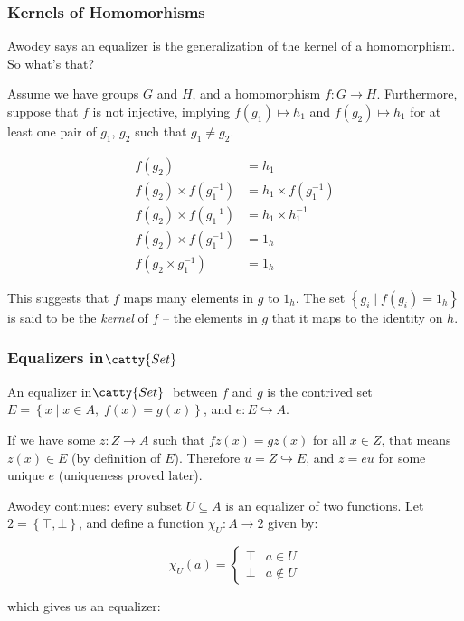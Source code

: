\documentclass[]{article}
\newcommand{\setn}[1]{\left\{#1\right\}}
\newcommand{\tfarr}[4][\to]{\ensuremath{#2 : #3 #1 #4}}
\newcommand{\cat}[1]{\ensuremath{\!\! \catty{#1} \,\,}}
\begin{document}
\subsubsection{Kernels of Homomorhisms}

Awodey says an equalizer is the generalization of the kernel of a homomorphism.
So what's that?

Assume we have groups $G$ and $H$, and a homomorphism \tfarr{f}{G}{H}.
Furthermore, suppose that $f$ is not injective, implying $f(g_1) \mapsto h_1$
and $f(g_2) \mapsto h_1$ for at least one pair of $g_1$, $g_2$ such that $g_1
\not = g_2$.

\begin{align*}
  f(g_2) &= h_1 \\
  f(g_2) \times f(g_1^{-1}) &= h_1 \times f(g_1^{-1}) \\
  f(g_2) \times f(g_1^{-1}) &= h_1 \times h_1^{-1} \\
  f(g_2) \times f(g_1^{-1}) &= 1_h \\
  f(g_2 \times g_1^{-1}) &= 1_h
\end{align*}

This suggests that $f$ maps many elements in $g$ to $1_h$. The set
$\setn{g_i\;|\;f(g_i) = 1_h}$ is said to be the \emph{kernel} of $f$ -- the
elements in $g$ that it maps to the identity on $h$.


\subsubsection{Equalizers in \cat{Set}}

An equalizer in \cat{Set} between $f$ and $g$ is the contrived set $E =
\setn{x\;|\; x \in A,\;f(x) = g(x)}$, and \tfarr[\hookrightarrow]{e}{E}{A}.

If we have some \tfarr{z}{Z}{A} such that $fz(x)=gz(x)$ for all $x \in Z$, that
means $z(x) \in E$ (by definition of $E$). Therefore $u = Z \hookrightarrow
E$, and $z = eu$ for some unique $e$ (uniqueness proved later).

Awodey continues: every subset $U \subseteq A$ is an equalizer of two functions.
Let $2 = \setn{\top, \bot}$, and define a function \tfarr{\chi_U}{A}{2} given
by:

$$
\chi_U(a) =
\begin{cases}
  \top & a \in U \\
  \bot & a \not \in U
\end{cases}
$$

which gives us an equalizer:
\end{document}
